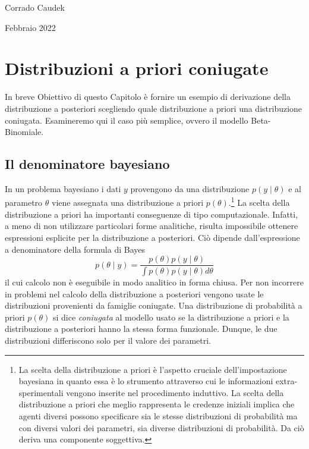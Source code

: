 \documentclass[
  11pt,
  italian,
  a4paper,
  extrafontsizes,onecolumn,openright
  ]{memoir}
\newenvironment{Summary}
  {\begin{bclogo}[logo=\bctrombone, noborder=true, couleur=lightgray!50]{In breve}\parindent0pt}
  {\end{bclogo}}
\theoremstyle{definition}
\theoremstyle{definition}
\theoremstyle{definition}
\theoremstyle{definition}
\theoremstyle{remark}
\begin{document}
Corrado Caudek

\bigskip

Febbraio 2022

\mainmatter

\hypertarget{chapter-distr-coniugate}{%
\chapter{Distribuzioni a priori coniugate}\label{chapter-distr-coniugate}}

\begin{Summary}
Obiettivo di questo Capitolo è fornire un esempio di derivazione della
distribuzione a posteriori scegliendo quale distribuzione a priori una
distribuzione coniugata. Esamineremo qui il caso più semplice, ovvero il
modello Beta-Binomiale.
\end{Summary}

\hypertarget{il-denominatore-bayesiano}{%
\section{Il denominatore bayesiano}\label{il-denominatore-bayesiano}}

In un problema bayesiano i dati \(y\) provengono da una distribuzione \(p(y \mid \theta)\) e al parametro \(\theta\) viene assegnata una distribuzione a priori \(p(\theta)\).\footnote{La scelta della distribuzione a priori è l'aspetto cruciale dell'impostazione bayesiana in quanto essa è lo strumento attraverso cui le informazioni extra-sperimentali vengono inserite nel procedimento induttivo. La scelta della distribuzione a priori che meglio rappresenta le credenze iniziali implica che agenti diversi possono specificare sia le stesse distribuzioni di probabilità ma con diversi valori dei parametri, sia diverse distribuzioni di probabilità. Da ciò deriva una componente soggettiva.} La scelta della distribuzione a priori ha importanti conseguenze di tipo computazionale. Infatti, a meno di non utilizzare particolari forme analitiche, risulta impossibile ottenere espressioni esplicite per la distribuzione a posteriori. Ciò dipende dall'espressione a denominatore della formula di Bayes
\begin{equation}
p(\theta \mid y) = \frac{p(\theta) p(y \mid \theta)}{\int p(\theta) p(y \mid \theta) d \theta}
\end{equation}
il cui calcolo non è eseguibile in modo analitico in forma chiusa.
Per non incorrere in problemi nel calcolo della distribuzione a posteriori vengono usate le distribuzioni provenienti da famiglie coniugate.
Una distribuzione di probabilità a priori \(p(\theta)\) si dice \emph{coniugata} al modello usato se la distribuzione a priori e la distribuzione a posteriori hanno la stessa forma funzionale. Dunque, le due distribuzioni differiscono solo per il valore dei parametri.
\end{document}
